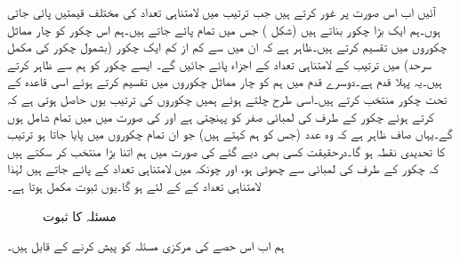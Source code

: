 آئیں اب اس صورت پر غور کرتے ہیں جب ترتیب میں لامتناہی تعداد کی مختلف قیمتیں پائی جاتی ہوں۔ہم ایک بڑا چکور  بناتے ہیں  (شکل ) جس میں تمام  پائے جاتے ہیں۔ہم اس چکور کو چار مماثل  چکوروں میں تقسیم کرتے ہیں۔ظاہر ہے کہ ان میں سے کم از کم ایک چکور (بشمول چکور کی مکمل سرحد) میں ترتیب کے لامتناہی تعداد کے اجزاء پائے جائیں گے۔ ایسے چکور کو ہم  سے ظاہر کرتے ہیں۔یہ پہلا قدم ہے۔دوسرے قدم میں ہم  کو چار مماثل چکوروں میں تقسیم کرتے ہوئے اسی قاعدہ کے تحت چکور  منتخب کرتے ہیں۔اسی طرح چلتے ہوئے ہمیں چکوروں کی ترتیب 
 یوں حاصل ہوتی ہے کہ  کرتے ہوئے چکور  کے طرف کی لمبائی صفر کو پہنچتی ہے اور  کی صورت میں  میں تمام  شامل ہوں گے۔یہاں صاف ظاہر ہے کہ  وہ عدد (جس کو ہم  کہتے ہیں) جو ان تمام چکوروں میں پایا جاتا ہو ترتیب کا تحدیدی نقطہ ہو گا۔درحقیقت کسی بھی دیے گئے  کی صورت میں ہم  اتنا بڑا منتخب کر سکتے ہیں کہ  چکور  کے  طرف کی لمبائی  سے چھوٹی ہو، اور چونکہ  میں لامتناہی تعداد کے  پائے جاتے ہیں لہٰذا  لامتناہی تعداد کے  کے لئے  ہو گا۔یوں ثبوت مکمل ہوتا ہے۔
\begin{figure}
\centering
{}
\caption{مسئلہ  کا ثبوت}
\label{شکل_مسئلہ_ترتیب_بلزانو_وائشسٹراس}
\end{figure}

ہم اب اس حصے کی مرکزی مسئلہ کو پیش کرنے کے قابل ہیں۔

\quad {}\\

